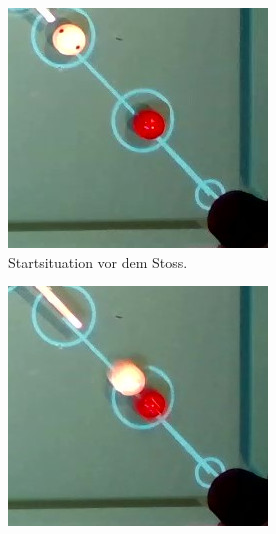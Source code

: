 \begin{figure}[h!]
    \centering
    \begin{subfigure}[t]{0.2\textwidth}
        \centering
        \includegraphics[width=1.0\linewidth]{../common/04_results/resources/simulation_vs_reality/video_13_0030_0034_situation_cut.jpg}
        \caption{Startsituation vor dem Stoss.}
        \label{fig:video_13_0030_0034_situation}
    \end{subfigure}
    \hfill
    \begin{subfigure}[t]{0.2\textwidth}
        \centering
        \includegraphics[width=1.0\linewidth]{../common/04_results/resources/simulation_vs_reality/video_13_0030_0034_collision_cut.jpg}

\end{subfigure}
\end{figure}
